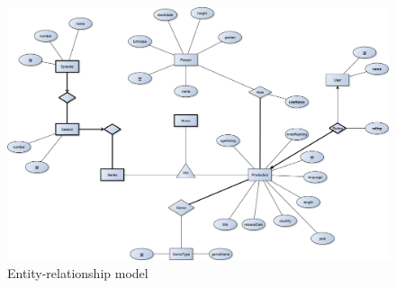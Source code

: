 \documentclass[12pt,table,xcdraw]{article}
\begin{document}
	
	
	\begin{figure}
		\centering
		\centerline{\includegraphics[scale=0.35]{figures/ERD.pdf}}
		\caption{Entity-relationship model}
	\end{figure}

	
	
	
	
	
\end{document}
